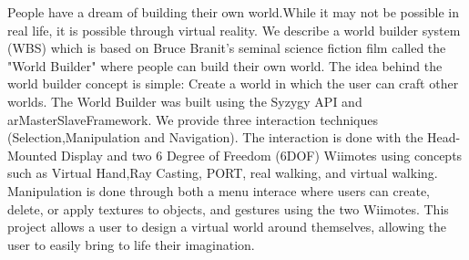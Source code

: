 People have a dream of building their own world.While it may not be possible in real life, it is possible through virtual reality.
We describe a world builder system (WBS) which is based on Bruce Branit’s seminal science fiction film called the "World Builder" where people can build their own world.
The idea behind the world builder concept is simple: Create a world in which the user can craft other worlds.
The World Builder was built using the Syzygy API and arMasterSlaveFramework.
We provide three interaction techniques (Selection,Manipulation and Navigation).
The interaction is done with the Head-Mounted Display and two 6 Degree of Freedom (6DOF) Wiimotes using concepts such as Virtual Hand,Ray Casting, PORT, real walking, and virtual walking.
Manipulation is done through both a menu interace where users can create, delete, or apply textures to objects, and gestures using the two Wiimotes.
This project allows a user to design a virtual world around themselves, allowing the user to easily bring to life their imagination.
